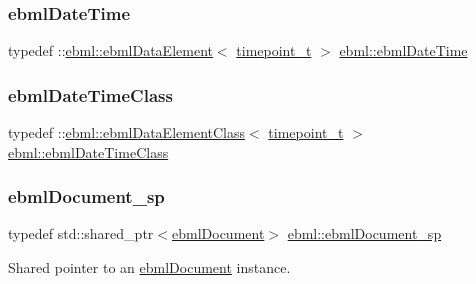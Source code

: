 \mbox{\label{namespaceebml_a544c5c28e36511ffd20b5907e551754f}} 
\subsubsection{\texorpdfstring{ebml\+Date\+Time}{ebmlDateTime}}
{\footnotesize\ttfamily typedef \+::\mbox{\hyperlink{classebml_1_1ebmlDataElement}{ebml\+::ebml\+Data\+Element}}$<$ \mbox{\hyperlink{namespaceebml_a7e667ec3fe8b51fb5b8f9690734d8638}{timepoint\+\_\+t}} $>$ \mbox{\hyperlink{namespaceebml_a544c5c28e36511ffd20b5907e551754f}{ebml\+::ebml\+Date\+Time}}}

\mbox{\label{namespaceebml_afea0376d38786592ad3e71d619256ab5}} 
\subsubsection{\texorpdfstring{ebml\+Date\+Time\+Class}{ebmlDateTimeClass}}
{\footnotesize\ttfamily typedef \+::\mbox{\hyperlink{classebml_1_1ebmlDataElementClass}{ebml\+::ebml\+Data\+Element\+Class}}$<$ \mbox{\hyperlink{namespaceebml_a7e667ec3fe8b51fb5b8f9690734d8638}{timepoint\+\_\+t}} $>$ \mbox{\hyperlink{namespaceebml_afea0376d38786592ad3e71d619256ab5}{ebml\+::ebml\+Date\+Time\+Class}}}

\mbox{\label{namespaceebml_a66018942b568da5041136a945148b450}} 
\subsubsection{\texorpdfstring{ebml\+Document\+\_\+sp}{ebmlDocument\_sp}}
{\footnotesize\ttfamily typedef std\+::shared\+\_\+ptr$<$\mbox{\hyperlink{classebml_1_1ebmlDocument}{ebml\+Document}}$>$ \mbox{\hyperlink{namespaceebml_a66018942b568da5041136a945148b450}{ebml\+::ebml\+Document\+\_\+sp}}}

Shared pointer to an \mbox{\hyperlink{classebml_1_1ebmlDocument}{ebml\+Document}} instance. \mbox{\label{namespaceebml_acfead4f724a6f8d55c730c6fbd362cea}} 
